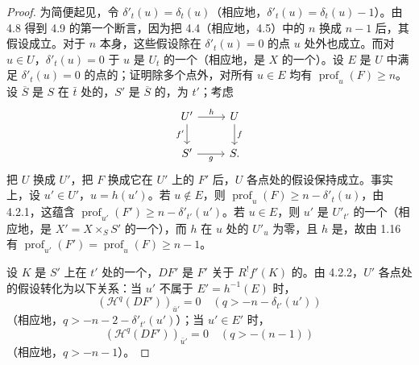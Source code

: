 \begin{proof}
为简便起见，令 $\delta'_t(u)=\delta_t(u)$（相应地，$\delta'_t(u)=\delta_t(u)-1$）。由 4.8 得到 4.9 的第一个断言，因为把 4.4（相应地，4.5）中的 $n$ 换成 $n-1$ 后，其假设成立。对于 $n$ 本身，这些假设除在 $\delta'_t(u)=0$ 的点 $u$ 处外也成立。而对 $u\in U$，$\delta'_t(u)=0$ 于 $u$ 是 $U_t$ 的一个（相应地，是 $X$ 的一个）。设 $E$ 是 $U$ 中满足 $\delta'_t(u)=0$ 的点的；证明除多个点外，对所有 $u\in E$ 均有 $\operatorname{prof}_u(F)\geq n$。设 $\overline S$ 是 $S$ 在 $\bar t$ 处的，$S'$ 是 $\overline S$ 的，为 $t'$；考虑
\[
\begin{tikzcd}
U'\arrow[r,"h"]\arrow[d,"f'"']&U\arrow[d,"f"]\\
S'\arrow[r,"g"']&S.
\end{tikzcd}
\]
把 $U$ 换成 $U'$，把 $F$ 换成它在 $U'$ 上的 $F'$ 后，$U$ 各点处的假设保持成立。事实上，设 $u'\in U'$，$u=h(u')$。若 $u\notin E$，则 $\operatorname{prof}_u(F)\geq n-\delta'_t(u)$，由 4.2.1，这蕴含 $\operatorname{prof}_{u'}(F')\geq n-\delta'_{t'}(u')$。若 $u\in E$，则 $u'$ 是 $U'_{t'}$ 的一个（相应地，是 $X'=X\times_SS'$ 的一个），而 $h$ 在 $u$ 处的 $U'_u$ 为零，且 $h$ 是，故由 1.16 有 $\operatorname{prof}_{u'}(F')=\operatorname{prof}_u(F)\geq n-1$。

设 $K$ 是 $S'$ 上在 $t'$ 处的一个，$DF'$ 是 $F'$ 关于 $R^!f'(K)$ 的。由 4.2.2，$U'$ 各点处的假设转化为以下关系：当 $u'$ 不属于 $E'=h^{-1}(E)$ 时，
\[
(\mathcal H^q(DF'))_{\bar u'}=0\quad(q>-n-\delta_{t'}(u'))
\]
（相应地，$q>-n-2-\delta'_{t'}(u')$）；当 $u'\in E'$ 时，
\[
(\mathcal H^q(DF'))_{\bar u'}=0\quad(q>-(n-1))
\]
（相应地，$q>-n-1$）。


\end{proof}
